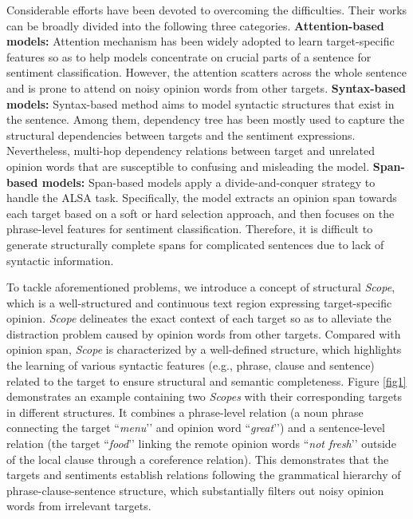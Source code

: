 \documentclass{article}
\begin{document}
Considerable efforts have been devoted to overcoming the difficulties. Their works can be broadly divided into the following three categories. \textbf{Attention-based models:} Attention mechanism has been widely adopted to learn target-specific features \cite{wang2016attention,ma2017interactive} so as to help models concentrate on crucial parts of a sentence for sentiment classification. However, the attention scatters across the whole sentence and is prone to attend on noisy opinion words from other targets. \textbf{Syntax-based models:} Syntax-based method aims to model syntactic structures that exist in the sentence. Among them, dependency tree \cite{zhang2019aspect,sun2019aspect,wang2020relational} has been mostly used to capture the structural dependencies between targets and the sentiment expressions. Nevertheless, multi-hop dependency relations between target and unrelated opinion words that are susceptible to confusing and misleading the model. \textbf{Span-based models:} Span-based models \cite{wang2018learning,hu2019learning,xu2020aspect} apply a divide-and-conquer strategy to handle the ALSA task. Specifically, the model extracts an opinion span towards each target based on a soft or hard selection approach, and then focuses on the phrase-level features for sentiment classification. Therefore, it is difficult to generate structurally complete spans for complicated sentences due to lack of syntactic information.

To tackle aforementioned problems, we introduce a concept of structural \emph{Scope}, which is a well-structured and continuous text region expressing target-specific opinion. \emph{Scope} delineates the exact context of each target so as to alleviate the distraction problem caused by opinion words from other targets. Compared with opinion span, \emph{Scope} is characterized by a well-defined structure, which highlights the learning of various syntactic features (e.g., phrase, clause and sentence) related to the target to ensure structural and semantic completeness. Figure \ref{fig1} demonstrates an example containing two \emph{Scopes} with their corresponding targets in different structures. It combines a phrase-level relation (a noun phrase connecting the target ``\emph{menu}’’ and opinion word ``\emph{great}’’) and a sentence-level relation (the target ``\emph{food}’’ linking the remote opinion words ``\emph{not fresh}’’ outside of the local clause through a coreference relation). This demonstrates that the targets and sentiments establish relations following the grammatical hierarchy of phrase-clause-sentence structure, which substantially filters out noisy opinion words from irrelevant targets.
\end{document}

